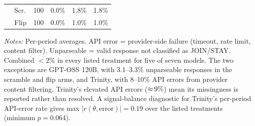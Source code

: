 \begin{table}[t]
\begin{tabular}{llcccc}
 & Scr. & 100 & 0.0\% & 1.8\% & 1.8\% \\
 & Flip & 100 & 0.0\% & 1.0\% & 1.0\% \\
\bottomrule
\end{tabular}
\begin{tablenotes}
\footnotesize\emph{Notes:} Per-period averages. API error = provider-side failure (timeout, rate limit, content filter). Unparseable = valid response not classified as JOIN/STAY. Combined $< 2$\% in every listed treatment for five of seven models. The two exceptions are GPT-OSS 120B, with 3.1--3.3\% unparseable responses in the scramble and flip arms, and Trinity, with 8--10\% API errors from provider content filtering. Trinity's elevated API errors (${\approx}\,9\%$) mean its missingness is reported rather than resolved. A signal-balance diagnostic for Trinity's per-period API-error rate gives max $|r(\theta, \text{error})| = 0.19$ over the listed treatments (minimum $p = 0.064$).
\end{tablenotes}
\end{table}

